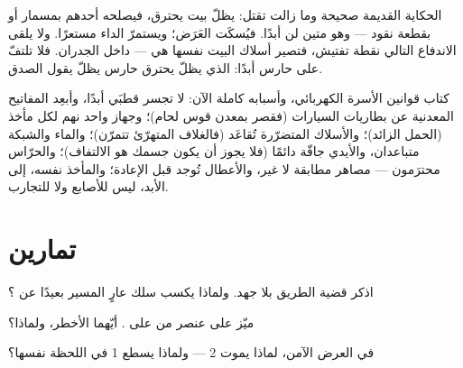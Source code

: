 \begin{remark}\label{rem:g7:short-circuits-safety:nail}
الحكاية القديمة صحيحة وما زالت تقتل: يظلّ  بيت يحترق،
فيصلحه أحدهم بمسمار أو بقطعة نقود --- وهو  متين لن 
أبدًا. فيُسكَت العَرَض؛ ويستمرّ الداء مستعرًا. ولا يلقى
الاندفاع التالي نقطة تفتيش، فتصير أسلاك البيت نفسها هي 
--- داخل الجدران. فلا تلتفّ على حارس أبدًا:  الذي يظلّ
يحترق حارس يظلّ يقول الصدق.
\end{remark}

\begin{remark}\label{rem:g7:short-circuits-safety:rules}
كتاب قوانين الأسرة الكهربائي، وأسبابه كاملة الآن: لا تجسر
قطبَي  أبدًا، وأبعِد المفاتيح المعدنية عن بطاريات
السيارات (فقصر  بمعدن قوس لحام)؛ وجهاز واحد نهم 
لكل مأخذ (الحمل الزائد)؛ والأسلاك المتضرّرة تُقاعَد (فالغلاف
المتهرّئ  تتمرّن)؛ والماء والشبكة متباعدان، والأيدي
جافّة دائمًا (فلا يجوز أن يكون جسمك هو الالتفاف)؛ والحرّاس
محترَمون --- مصاهر مطابقة لا غير، والأعطال تُوجد قبل الإعادة؛
والمأخذ نفسه، إلى الأبد، ليس للأصابع ولا للتجارب.
\end{remark}

\section{تمارين}

\begin{exercise}[$\star$]\label{exo:g7:short-circuits-safety:1}
اذكر قضية الطريق بلا جهد. ولماذا يكسب سلك عارٍ المسير بعيدًا
عن ؟
\end{exercise}

\begin{exercise}[$\star$]\label{exo:g7:short-circuits-safety:2}
ميّز  على عنصر من  على .
أيّهما الأخطر، ولماذا؟
\end{exercise}

\begin{exercise}[$\star$]\label{exo:g7:short-circuits-safety:3}
في العرض الآمن، لماذا يموت  2 --- ولماذا يسطع  1
في اللحظة نفسها؟
\end{exercise}

